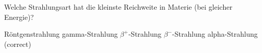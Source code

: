 \documentclass[11pt]{exam}
\begin{document}
\begin{questions}
\vspace{3mm}\question Welche Strahlungsart hat die kleinste Reichweite in Materie (bei gleicher Energie)?

\begin{choices}
	\choice Röntgenstrahlung
	\choice gamma-Strahlung
	\choice \( \beta^+ \)-Strahlung
	\choice \( \beta^- \)-Strahlung
	\choice alpha-Strahlung (correct)
\end{choices}

\vspace{3mm}\end{questions}
\end{document}
